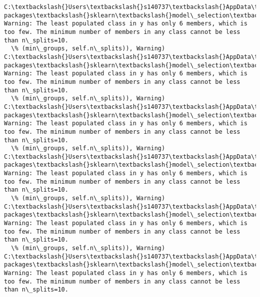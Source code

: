 \documentclass[11pt]{article}
\begin{document}
    \begin{Verbatim}[commandchars=\\\{\}]
C:\textbackslash{}Users\textbackslash{}s140737\textbackslash{}AppData\textbackslash{}Local\textbackslash{}Continuum\textbackslash{}anaconda3\textbackslash{}lib\textbackslash{}site-packages\textbackslash{}sklearn\textbackslash{}model\_selection\textbackslash{}\_split.py:605: Warning: The least populated class in y has only 6 members, which is too few. The minimum number of members in any class cannot be less than n\_splits=10.
  \% (min\_groups, self.n\_splits)), Warning)
C:\textbackslash{}Users\textbackslash{}s140737\textbackslash{}AppData\textbackslash{}Local\textbackslash{}Continuum\textbackslash{}anaconda3\textbackslash{}lib\textbackslash{}site-packages\textbackslash{}sklearn\textbackslash{}model\_selection\textbackslash{}\_split.py:605: Warning: The least populated class in y has only 6 members, which is too few. The minimum number of members in any class cannot be less than n\_splits=10.
  \% (min\_groups, self.n\_splits)), Warning)
C:\textbackslash{}Users\textbackslash{}s140737\textbackslash{}AppData\textbackslash{}Local\textbackslash{}Continuum\textbackslash{}anaconda3\textbackslash{}lib\textbackslash{}site-packages\textbackslash{}sklearn\textbackslash{}model\_selection\textbackslash{}\_split.py:605: Warning: The least populated class in y has only 6 members, which is too few. The minimum number of members in any class cannot be less than n\_splits=10.
  \% (min\_groups, self.n\_splits)), Warning)
C:\textbackslash{}Users\textbackslash{}s140737\textbackslash{}AppData\textbackslash{}Local\textbackslash{}Continuum\textbackslash{}anaconda3\textbackslash{}lib\textbackslash{}site-packages\textbackslash{}sklearn\textbackslash{}model\_selection\textbackslash{}\_split.py:605: Warning: The least populated class in y has only 6 members, which is too few. The minimum number of members in any class cannot be less than n\_splits=10.
  \% (min\_groups, self.n\_splits)), Warning)
C:\textbackslash{}Users\textbackslash{}s140737\textbackslash{}AppData\textbackslash{}Local\textbackslash{}Continuum\textbackslash{}anaconda3\textbackslash{}lib\textbackslash{}site-packages\textbackslash{}sklearn\textbackslash{}model\_selection\textbackslash{}\_split.py:605: Warning: The least populated class in y has only 6 members, which is too few. The minimum number of members in any class cannot be less than n\_splits=10.
  \% (min\_groups, self.n\_splits)), Warning)
C:\textbackslash{}Users\textbackslash{}s140737\textbackslash{}AppData\textbackslash{}Local\textbackslash{}Continuum\textbackslash{}anaconda3\textbackslash{}lib\textbackslash{}site-packages\textbackslash{}sklearn\textbackslash{}model\_selection\textbackslash{}\_split.py:605: Warning: The least populated class in y has only 6 members, which is too few. The minimum number of members in any class cannot be less than n\_splits=10.

\end{Verbatim}
\end{document}
